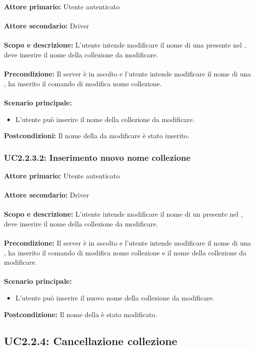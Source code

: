\documentclass{scalatekids-article}
\begin{document}
\textbf{Attore primario:} Utente autenticato\\ \\
\textbf{Attore secondario:} Driver\\ \\
\textbf{Scopo e descrizione:} L'utente intende modificare il nome di una  presente nel , deve inserire il nome della collezione da modificare.\\ \\
\textbf{Precondizione:} Il server è in ascolto e l'utente intende modificare il nome di una , ha inserito il comando di modifica nome collezione.\\ \\
\textbf{Scenario principale:}
\begin{itemize}
\item L'utente può inserire il nome della collezione da modificare.
\end{itemize}
\textbf{Postcondizioni:} Il nome della  da modificare è stato inserito.

\subsubsection{UC2.2.3.2: Inserimento nuovo nome collezione}

\textbf{Attore primario:} Utente autenticato\\ \\
\textbf{Attore secondario:} Driver\\ \\
\textbf{Scopo e descrizione:} L'utente intende modificare il nome di un  presente nel , deve inserire il nome della collezione da modificare.\\ \\
\textbf{Precondizione:} Il server è in ascolto e l'utente intende modificare il nome di una , ha inserito il comando di modifica nome collezione e il nome della collezione da modificare.\\ \\
\textbf{Scenario principale:}
\begin{itemize}
\item L'utente può inserire il nuovo nome della collezione da modificare.
\end{itemize}
\textbf{Postcondizione:} Il nome della  è stato modificato.

\subsection{UC2.2.4: Cancellazione collezione}
\end{document}
